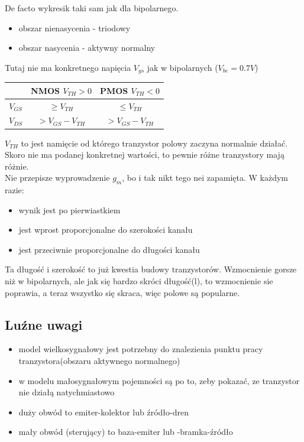 \documentclass[10pt,a4paper]{article}
\begin{document}
De facto wykresik taki sam jak dla bipolarnego.
\begin{itemize}
\item obszar nienasycenia - triodowy
\item obszar nasycenia - aktywny normalny
\end{itemize}

Tutaj nie ma konkretnego napięcia $V_{gs}$ jak w bipolarnych ($V_{be} = 0.7V$)

\begin{center}
\begin{tabular}{c|c|c}
& NMOS $V_{TH} > 0$ & PMOS $V_{TH} < 0$ \\
\hline
$V_{GS}$ & $\geq V_{TH}$ & $\leq V_{TH}$ \\ 

$V_{DS}$ & $> V_{GS} - V_{TH}$ & $> V_{GS} - V_{TH}$\\ 
\end{tabular}
\end{center}

$V_{TH}$ to jest namięcie od którego tranzystor polowy zaczyna normalnie działać. Skoro nie ma podanej konkretnej wartości, to pewnie różne tranzystory mają różnie.\\
Nie przepisze wyprowadzenie $g_m$, bo i tak nikt tego nei zapamięta. W każdym razie:
\begin{itemize}
\item wynik jest po pierwiastkiem
\item jest wprost proporcjonalne do szerokości kanału
\item jest przeciwnie proporcjonalne do długości kanału
\end{itemize}
Ta długość i szerokość to już kwestia budowy tranzystorów. Wzmocnienie gorsze niż w bipolarnych, ale jak się bardzo skróci długość(l), to wzmocnienie sie poprawia, a teraz wszystko się skraca, więc polowe są popularne.

\subsection{Luźne uwagi}
\begin{itemize}
\item model wielkosygnałowy jest potrzebny do znalezienia punktu pracy tranzystora(obszaru aktywnego normalnego)
\item w modelu małosygnałowym pojemności są po to, zeby pokazać, ze tranzystor nie działą natychmiastowo
\item duży obwód to emiter-kolektor lub źródło-dren
\item mały obwód (sterujący) to baza-emiter lub -bramka-źródło
\end{itemize}
\end{document}
